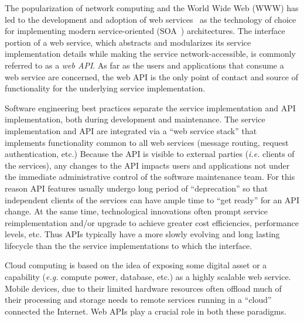 
The popularization of network computing and the World Wide Web (WWW) 
has led to the development and adoption of web services~\cite{6094008} as
the technology of choice for implementing modern service-oriented
(SOA~\cite{Haines:2010:SAM:1787234.1787269}) architectures.
The
interface portion of a web service, which abstracts and modularizes
its service implementation
details while making the service network-accessible, is commonly referred to
as a {\em web API}. As far as the users and applications that consume a 
web service
are concerned, the web API is the only point of contact and source of
functionality for the underlying service implementation.

Software engineering best practices separate the service implementation
and API implementation, both during development and maintenance.
The service implementation and API are integrated via 
a ``web service stack'' that implements functionality common to all web
services (message routing, request authentication, etc.)
Because the API is visible to external parties ({\em i.e.} clients of the
services), any changes to the API
impacts users and applications not under the immediate administrative control
of the software maintenance team.  For this reason API features 
usually undergo long
period of ``deprecation'' so that independent clients of the services can have
ample time to ``get ready'' for an API change.  At the same time,
technological innovations often prompt service reimplementation and/or 
upgrade to
achieve greater cost efficiencies, performance levels, etc.
Thus APIs typically have a more
slowly evolving and long lasting lifecycle than the the service
implementations
to which the interface. 

Cloud computing is based on the idea of exposing some digital asset or a
capability ({\em e.g.} compute power, database, etc.) 
as a highly scalable web service.  Mobile
devices, due to their limited hardware resources often offload much of their
processing and storage needs to remote services running in a ``cloud''
connected the Internet.  Web APIs
play a crucial role in both these paradigms. 

